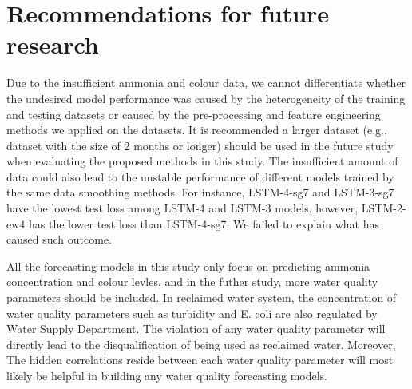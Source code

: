 \section{Recommendations for future research}
Due to the insufficient ammonia and colour data, we cannot differentiate whether the undesired model performance was caused by the heterogeneity of the training and testing datasets or caused by the pre-processing and feature engineering methods we applied on the datasets. It is recommended a larger dataset (e.g., dataset with the size of 2 months or longer) should be used in the future study when evaluating the proposed methods in this study. The insufficient amount of data could also lead to the unstable performance of different models trained by the same data smoothing methods. For instance, LSTM-4-sg7 and LSTM-3-sg7 have the lowest test loss among LSTM-4 and LSTM-3 models, however, LSTM-2-ew4 has the lower test loss than LSTM-4-sg7. We failed to explain what has caused such outcome. 

All the forecasting models in this study only focus on predicting ammonia concentration and colour levles, and in the futher study, more water quality parameters should be included. In reclaimed water system, the concentration of water quality parameters such as turbidity and E. coli are also regulated by Water Supply Department. The violation of any water quality parameter will directly lead to the disqualification of being used as reclaimed water. Moreover, The hidden correlations reside between each water quality parameter will most likely be helpful in building any water quality forecasting models.

